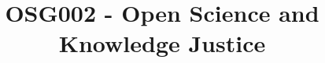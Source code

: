 \documentclass{article}
\begin{document}
\title{OSG002 - Open Science and Knowledge Justice}

\maketitle
\end{document}
